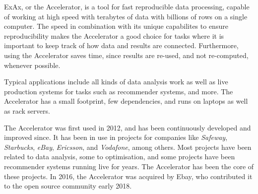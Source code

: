 
ExAx, or the Accelerator, is a tool for fast reproducible data
processing, capable of working at high speed with terabytes of data
with billions of rows on a single computer.  The speed in combination
with its unique capabilites to ensure reproducibility makes the
Accelerator a good choice for tasks where it is important to keep
track of how data and results are connected.  Furthermore, using the
Accelerator saves time, since results are re-used, and not
re-computed, whenever possible.

Typical applications include all kinds of data analysis work as well
as live production systems for tasks such as recommender systems, and
more.  The Accelerator has a small footprint, few dependencies, and
runs on laptops as well as rack servers.

The Accelerator was first used in 2012, and has been continuously developed and
improved since.  It has been in use in projects for companies like
\textsl{Safeway}, \textsl{Starbucks}, \textsl{eBay}, \textsl{Ericsson},
and \textsl{Vodafone}, among others.  Most projects have been related to data
analysis, some to optimisation, and some projects have been
recommender systems running live for years.  The Accelerator has
been the core of these projects.  In 2016, the Accelerator was
acquired by Ebay, who contributed it to the open source community
early 2018.

